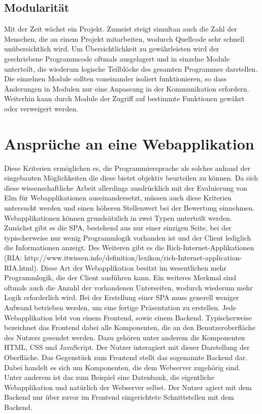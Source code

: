 \subsection{Modularität}
\label{sec:Modularität_Analyse}
Mit der Zeit wächst ein Projekt. Zumeist steigt simultan auch die Zahl der Menschen, die an einem Projekt mitarbeiten, wodurch Quellcode sehr schnell unübersichtlich wird. Um Übersichtlichkeit zu gewährleisten wird der geschriebene Programmcode oftmals ausgelagert und in einzelne Module unterteilt, die wiederum logische Teilblöcke des gesamten Programmes darstellen. Die einzelnen Module sollten voneinander isoliert funktionieren, so dass Änderungen in Modulen nur eine Anpassung in der Kommunikation erfordern. Weiterhin kann durch Module der Zugriff auf bestimmte Funktionen gewährt oder verweigert werden.


\section{Ansprüche an eine Webapplikation}
\label{Ansprüche an eine Webapplikation}
Diese Kriterien ermöglichen es, die Programmiersprache als solches anhand der eingebauten Möglichkeiten die diese bietet objektiv beurteilen zu können. Da sich diese wissenschaftliche Arbeit allerdings ausdrücklich mit der Evaluierung von Elm für Webapplikationen auseinandersetzt, müssen auch diese Kriterien untersucht werden und einen höheren Stellenwert bei der Bewertung einnehmen.
Webapplikationen können grundsätzlich in zwei Typen unterteilt werden. Zunächst gibt es die  \ac{SPA}, bestehend aus nur einer einzigen Seite, bei der typischerweise nur wenig  Programmlogik vorhanden ist und der Client lediglich die Informationen anzeigt. Des Weiteren gibt es die Rich-Internet-Applikationen\\
(RIA: http://www.itwissen.info/definition/lexikon/rich-Internet-application-RIA.html). Diese Art der Webapplikation besitzt im wesentlichen mehr Programmlogik, die der Client ausführen kann. Ein weiteres Merkmal sind oftmals auch die Anzahl der vorhandenen Unterseiten, wodurch wiederum mehr Logik erforderlich wird.
Bei der Erstellung einer \ac{SPA} muss generell weniger Aufwand betrieben werden, um eine fertige Präsentation zu erstellen.
Jede Webapplikation lebt von einem Frontend, sowie einem Backend. Typischerweise bezeichnet das Frontend dabei alle Komponenten, die an den Benutzeroberfläche des Nutzers gesendet werden. Dazu gehören unter anderem die Komponenten HTML, CSS und JavaScript. Der Nutzer interagiert mit dieser Darstellung der Oberfläche.
Das Gegenstück zum Frontend stellt das sogenannte Backend dar. Dabei handelt es sich um Komponenten, die dem Webserver zugehörig sind. Unter anderem ist das zum Beispiel eine Datenbank, die eigentliche Webapplikation und natürlich der Webserver selbst. Der Nutzer agiert mit dem Backend nur über zuvor im Frontend eingerichtete Schnittstellen mit dem Backend.


